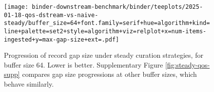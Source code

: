 \begin{figure}
\texttt{[image: binder-downstream-benchmark/binder/teeplots/2025-01-18-qos-dstream-vs-naive-steady/buffer\_size=64+font.family=serif+hue=algorithm+kind=line+palette=set2+style=algorithm+viz=relplot+x=num-items-ingested+y=max-gap-size+ext=.pdf]}
\caption{%
Progression of record gap size under steady curation strategies, for buffer size 64.
Lower is better.
Supplementary Figure \ref{fig:steady-qos-supp} compares gap size progressions at other buffer sizes, which behave similarly.
}
\label{fig:steady-qos}
\end{figure}
